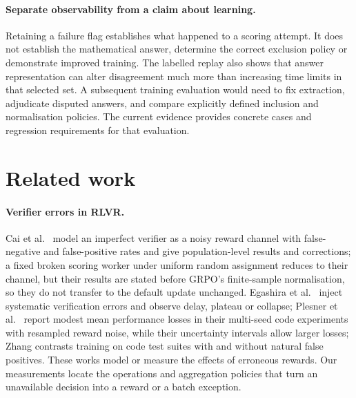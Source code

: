 \documentclass[10pt,a4paper]{article}
\let\cite\citep
\begin{document}
\paragraph{Separate observability from a claim about learning.}
Retaining a failure flag establishes what happened to a scoring attempt.
It does not establish the mathematical answer, determine the correct
exclusion policy or demonstrate improved training. The labelled replay
also shows that answer representation can alter disagreement much more
than increasing time limits in that selected set. A subsequent training
evaluation would need to fix extraction, adjudicate disputed answers, and
compare explicitly defined inclusion and normalisation policies. The
current evidence provides concrete cases and regression requirements for
that evaluation.

\section{Related work}
\label{sec:related}

\paragraph{Verifier errors in RLVR.}
Cai et al.\ \cite{cai2025noisy} model an imperfect verifier as a noisy reward
channel with false-negative and false-positive rates and give population-level
results and corrections; a fixed broken scoring worker under uniform random
assignment reduces to their channel, but their results are stated before
GRPO's finite-sample normalisation, so they do not transfer to the default
update unchanged. Egashira et al.\ \cite{egashira2026delay} inject systematic verification
errors and observe delay, plateau or collapse; Plesner et al.\
\cite{plesner2026imperfect} report modest mean performance losses in their
multi-seed code experiments with resampled reward noise, while their
uncertainty intervals allow larger losses; Zhang \cite{zhang2026leaky} contrasts training on
code test suites with and without natural false positives. These works
model or measure the effects of erroneous rewards. Our measurements locate
the operations and aggregation policies that turn an unavailable decision
into a reward or a batch exception.
\end{document}
